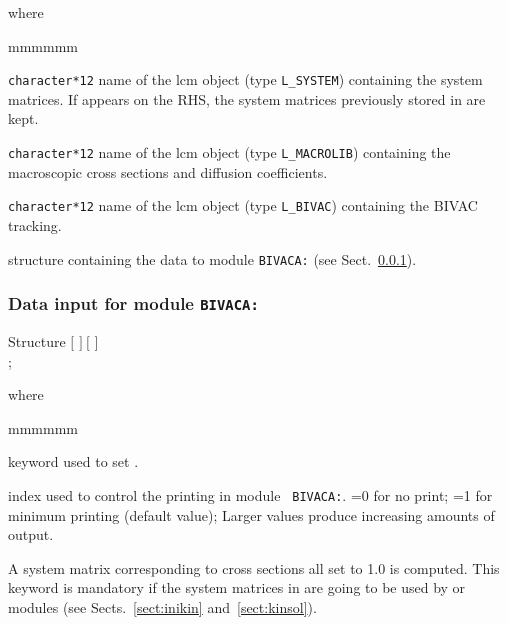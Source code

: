 \noindent where
\begin{ListeDeDescription}{mmmmmm}

\item[\dusa{SYST}] {\tt character*12} name of the {\sc lcm} object (type {\tt L\_SYSTEM}) containing the system matrices. If  appears on the RHS, the system matrices previously stored in  are kept.

\item[\dusa{MACRO}] {\tt character*12} name of the {\sc lcm} object (type {\tt L\_MACROLIB}) containing the macroscopic cross sections and diffusion coefficients.

\item[\dusa{TRACK}] {\tt character*12} name of the {\sc lcm} object (type {\tt L\_BIVAC}) containing the BIVAC {\sc tracking}.

\item[\dstr{bivaca\_data}] structure containing the data to module {\tt BIVACA:} (see Sect.~\ref{sect:bivaca_data}).

\end{ListeDeDescription}

\vskip 0.2cm

\subsubsection{Data input for module {\tt BIVACA:}}\label{sect:bivaca_data}

\begin{DataStructure}{Structure }
$[$   $]~[$  $]$ \\
;
\end{DataStructure}

\noindent where
\begin{ListeDeDescription}{mmmmmm}

\item[\moc{EDIT}] keyword used to set .

\item[\dusa{iprint}] index used to control  the printing in module {\tt
BIVACA:}. =0 for no print; =1 for minimum printing (default value); Larger
values produce increasing amounts of output.

\item[\moc{UNIT}] A system matrix corresponding to cross sections all set to 1.0 is computed. This keyword is mandatory if
the system matrices in  are going to be used by  or  modules (see Sects.~\ref{sect:inikin}
and~\ref{sect:kinsol}).

\end{ListeDeDescription}
\clearpage

